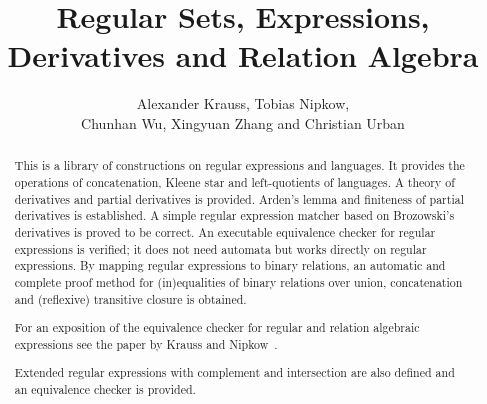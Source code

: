 \documentclass[11pt,a4paper]{article}
\begin{document}
\title{Regular Sets, Expressions, Derivatives and Relation Algebra}
\author{Alexander Krauss, Tobias Nipkow,\\
  Chunhan Wu, Xingyuan Zhang and Christian Urban}
\maketitle

\begin{abstract}
This is a library of constructions on regular expressions and languages.  It
provides the operations of concatenation, Kleene star and left-quotients of
languages. A theory of derivatives and partial derivatives is
provided. Arden's lemma and finiteness of partial derivatives is
established. A simple regular expression matcher based on Brozowski's
derivatives is proved to be correct.  An executable equivalence checker for
regular expressions is verified; it does not need automata but works directly
on regular expressions. By mapping regular expressions to binary relations, an
automatic and complete proof method for (in)equalities of binary relations
over union, concatenation and (reflexive) transitive closure is obtained.

For an exposition of the equivalence checker for regular and relation
algebraic expressions see the paper by Krauss and Nipkow~\cite{KraussN-JAR}.

Extended regular expressions with complement and intersection
are also defined and an equivalence checker is provided.
\end{abstract}

\tableofcontents





\end{document}
